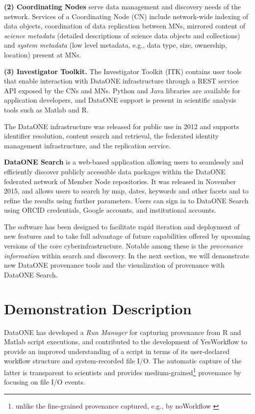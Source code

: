 \documentclass[a4paper]{llncs}
\newcommand{\mypara}[1]{\vspace{4pt}\noindent\textbf{#1}}
\begin{document}
\mypara{(2) Coordinating Nodes} serve data management and discovery needs of the network. Services of a Coordinating Node (CN) include network-wide indexing of data objects, coordination of data replication between MNs, mirrored content of \emph{science metadata} (detailed descriptions of science data objects and collections) and \emph{system metadata} (low level metadata, e.g., data type, size, ownership, location) present at MNs.


\mypara{(3) Investigator Toolkit.} The Investigator Toolkit (ITK) contains user tools that enable interaction with DataONE infrastructure through a REST service API exposed by the CNs and MNs. Python and Java libraries are available for application developers, and DataONE support is present in scientific analysis tools such as Matlab and R.


The DataONE infrastructure was released for public use in 2012 and supports identifier resolution, content search and retrieval, the federated identity management infrastructure, and the replication service.


\mypara{DataONE Search} is a web-based application allowing users to seamlessly and efficiently discover publicly accessible data packages within the DataONE federated network of Member Node repositories. It was released in November 2015, and allows users to search by map, dates, keywords and other facets and to refine the results using further parameters. Users can sign in to DataONE Search using ORCID credentials, Google accounts, and institutional accounts.

The software has been designed to facilitate rapid iteration and deployment of new features and to take full advantage of future capabilities offered by upcoming versions of the core cyberinfrastructure. Notable among these is the \emph{provenance information} within search and discovery. In the next section, we will demonstrate new DataONE provenance tools and the visualization of provenance with DataONE Search.


\section{Demonstration Description}  \label{demo}

DataONE has developed a \emph{Run Manager} for capturing provenance from R \cite{recordr} and Matlab \cite{matlabdataone} script executions, and contributed to the development of YesWorkflow \cite{yesworkflow} to provide an improved understanding of a script in terms of its user-declared workflow structure and system-recorded file I/O. The automatic capture of the latter is transparent to scientists and provides medium-grained\footnote{unlike the fine-grained provenance captured, e.g., by noWorkflow \cite{nw14}} provenance by focusing on file I/O events.
\end{document}
